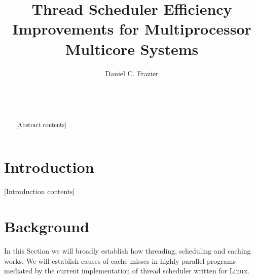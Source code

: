 \documentclass{sig-alternate}
\begin{document}

\title{Thread Scheduler Efficiency Improvements for Multiprocessor Multicore Systems}


\author{
\alignauthor
Daniel C. Frazier\\
	\\
	\\
	\\
}

\maketitle
\begin{abstract}
[Abstract contents]
\end{abstract}


\section{Introduction}
\label{sec:intro}

[Introduction contents]

\section{Background}
\label{sec:bg}

In this Section we will broadly establish how threading, scheduling and caching works. We will establish causes of cache misses in highly parallel programs mediated by the current implementation of thread scheduler written for Linux.
\end{document}
